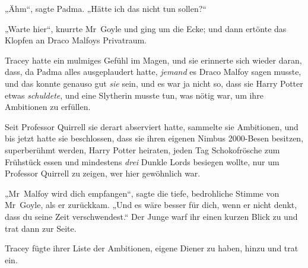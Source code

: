 „Ähm“, sagte Padma. „Hätte ich das nicht tun sollen?“

\later

„Warte hier“, knurrte Mr~Goyle und ging um die Ecke; und dann ertönte das Klopfen an Draco Malfoys Privatraum.

Tracey hatte ein mulmiges Gefühl im Magen, und sie erinnerte sich wieder daran, dass, da Padma alles ausgeplaudert hatte, \emph{jemand} es Draco Malfoy sagen musste, und das konnte genauso gut \emph{sie} sein, und es war ja nicht so, dass sie Harry Potter etwas \emph{schuldete}, und eine Slytherin musste tun, was nötig war, um ihre Ambitionen zu erfüllen.

Seit Professor Quirrell sie derart abserviert hatte, sammelte sie Ambitionen, und bis jetzt hatte sie beschlossen, dass sie ihren eigenen Nimbus 2000-Besen besitzen, superberühmt werden, Harry Potter heiraten, jeden Tag Schokofrösche zum Frühstück essen und mindestens \emph{drei} Dunkle Lords besiegen wollte, nur um Professor Quirrell zu zeigen, wer hier gewöhnlich war.

„Mr~Malfoy wird dich empfangen“, sagte die tiefe, bedrohliche Stimme von Mr~Goyle, als er zurückkam. „Und es wäre besser für dich, wenn er nicht denkt, dass du seine Zeit verschwendest.“ Der Junge warf ihr einen kurzen Blick zu und trat dann zur Seite.

Tracey fügte ihrer Liste der Ambitionen, eigene Diener zu haben, hinzu und trat ein.

